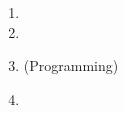 
\begin{SolutionSheet}[\ref{sheet2}]

  \begin{Solution}
  \end{Solution}

  \begin{Solution}
  \end{Solution}

  \begin{Solution}
  \end{Solution}

  \begin{Solution}
    \begin{enumerate}
    \item 
    \item 
    \item (Programming)
    \item 
    \end{enumerate}
  \end{Solution}

\end{SolutionSheet}


